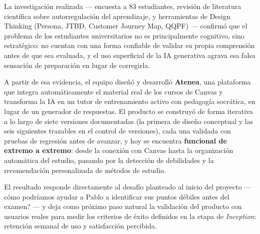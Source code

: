 \documentclass[11pt,a4paper]{article}
\begin{document}
La investigaci\'on realizada --- encuesta a 83 estudiantes, revisi\'on de literatura cient\'ifica sobre autorregulaci\'on del aprendizaje, y herramientas de Design Thinking (Persona, JTBD, Customer Journey Map, QQPF) --- confirm\'o que el problema de los estudiantes universitarios no es principalmente cognitivo, sino estrat\'egico: no cuentan con una forma confiable de validar su propia comprensi\'on antes de que sea evaluada, y el uso superficial de la IA generativa agrava esa falsa sensaci\'on de preparaci\'on en lugar de corregirla.

A partir de esa evidencia, el equipo dise\~n\'o y desarroll\'o \textbf{Atenea}, una plataforma que integra autom\'aticamente el material real de los cursos de Canvas y transforma la IA en un tutor de entrenamiento activo con pedagog\'ia socr\'atica, en lugar de un generador de respuestas. El producto se construy\'o de forma iterativa a lo largo de siete versiones documentadas (la primera de dise\~no conceptual y las seis siguientes trazables en el control de versiones), cada una validada con pruebas de regresi\'on antes de avanzar, y hoy se encuentra \textbf{funcional de extremo a extremo}: desde la conexi\'on con Canvas hasta la organizaci\'on autom\'atica del estudio, pasando por la detecci\'on de debilidades y la recomendaci\'on personalizada de m\'etodos de estudio.

El resultado responde directamente al desaf\'io planteado al inicio del proyecto --- \textquestiondown c\'omo podr\'iamos ayudar a Pablo a identificar sus puntos d\'ebiles antes del examen? --- y deja como pr\'oximo paso natural la validaci\'on del producto con usuarios reales para medir los criterios de \'exito definidos en la etapa de \emph{Inception}: retenci\'on semanal de uso y satisfacci\'on percibida.

\end{document}
